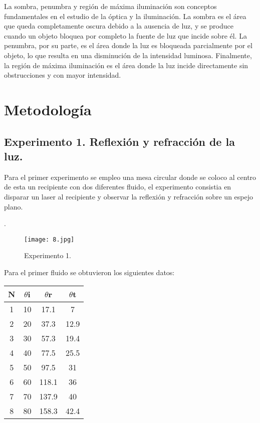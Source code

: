 \documentclass[10pt,journal]{IEEEtran}
\begin{document}
La sombra, penumbra y región de máxima iluminación son conceptos fundamentales en el estudio de la óptica y la iluminación.
La sombra es el área que queda completamente oscura debido a la ausencia de luz, y se produce cuando un objeto bloquea por completo la fuente de luz que incide sobre él. La penumbra, por su parte, es el área donde la luz es bloqueada parcialmente por el objeto, lo que resulta en una disminución de la intensidad luminosa. Finalmente, la región de máxima iluminación es el área donde la luz incide directamente sin obstrucciones y con mayor intensidad.

\section{Metodología}


\subsection{Experimento 1. Reflexión y refracción de la luz.}
Para el primer experimento se empleo una mesa circular donde se coloco al centro de esta un recipiente con dos diferentes fluido, el experimento consistia en disparar un laser al recipiente y observar la reflexión y refracción sobre un espejo plano.


.
\begin{figure}[!ht]
\begin {center}
\texttt{[image: 8.jpg]}
\caption{Experimento 1.}
\end {center}
\end{figure}

Para el primer fluido se obtuvieron los siguientes datos:
\begin{center}
\begin{tabular}{|c|c|c|c|}
\hline
N & $\theta$i & $\theta$r & $\theta$t \\
\hline
1 & 10 & 17.1 & 7\\
\hline
2 & 20 & 37.3 & 12.9\\
\hline
3 & 30 & 57.3 & 19.4\\
\hline
4 & 40 & 77.5 & 25.5\\
\hline
5 & 50 & 97.5 & 31\\
\hline
6 & 60 & 118.1 & 36\\
\hline
7 & 70 & 137.9 & 40\\
\hline
8 & 80 & 158.3 & 42.4\\
\hline
\end{tabular}
\end{center}
\end{document}
